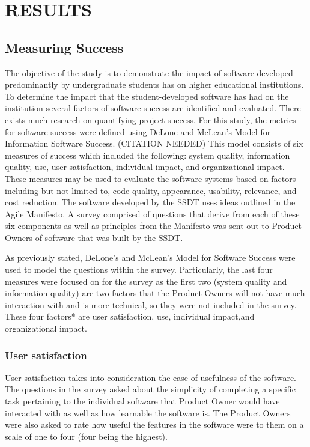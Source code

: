 \section{RESULTS}
\subsection{Measuring Success}

The objective of the study is to demonstrate the impact of software developed predominantly by undergraduate students has on higher educational institutions. To determine the impact that the student-developed software has had on the institution several factors of software success are identified and evaluated.  There exists much research on quantifying project success. For this study, the metrics for software success were defined using DeLone and McLean’s Model for Information Software Success. (CITATION NEEDED) This model consists of six measures of success which included the following: system quality, information quality, use, user satisfaction, individual impact, and organizational impact. These measures may be used to evaluate the software systems based on factors including but not limited to, code quality, appearance, usability, relevance, and cost reduction. The software developed by the SSDT uses ideas outlined in the Agile Manifesto. A survey comprised of questions that derive from each of these six components as well as principles from the Manifesto was sent out to Product Owners of software that was built by the SSDT.

As previously stated, DeLone's and McLean's Model for Software Success were used to model the questions within the survey. Particularly, the last four measures were focused on for the survey as the first two (system quality and information quality) are two factors that the Product Owners will not have much interaction with and is more technical, so they were not included in the survey. These four factors* are user satisfaction, use, individual impact,and organizational impact.

\subsubsection{User satisfaction}
User satisfaction takes into consideration the ease of usefulness of the software. The questions in the survey asked about the simplicity of completing a specific task pertaining to the individual software that Product Owner would have interacted with as well as how learnable the software is. The Product Owners were also asked to rate how useful the features in the software were to them on a scale of one to four (four being the highest).

